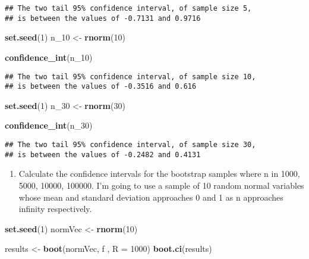 \documentclass[]{article}
\newenvironment{Shaded}{\begin{snugshade}}{\end{snugshade}}
\newcommand{\KeywordTok}[1]{\textcolor[rgb]{0.13,0.29,0.53}{\textbf{#1}}}
\newcommand{\DataTypeTok}[1]{\textcolor[rgb]{0.13,0.29,0.53}{#1}}
\newcommand{\DecValTok}[1]{\textcolor[rgb]{0.00,0.00,0.81}{#1}}
\newcommand{\StringTok}[1]{\textcolor[rgb]{0.31,0.60,0.02}{#1}}
\newcommand{\NormalTok}[1]{#1}
\providecommand{\tightlist}{%
  \setlength{\itemsep}{0pt}\setlength{\parskip}{0pt}}
\begin{document}
\begin{verbatim}
## The two tail 95% confidence interval, of sample size 5, 
## is between the values of -0.7131 and 0.9716
\end{verbatim}

\begin{Shaded}
\begin{Highlighting}[]
\KeywordTok{set.seed}\NormalTok{(}\DecValTok{1}\NormalTok{)}
\NormalTok{n_}\DecValTok{10}\NormalTok{ <-}\StringTok{ }\KeywordTok{rnorm}\NormalTok{(}\DecValTok{10}\NormalTok{)}

\KeywordTok{confidence_int}\NormalTok{(n_}\DecValTok{10}\NormalTok{)}
\end{Highlighting}
\end{Shaded}

\begin{verbatim}
## The two tail 95% confidence interval, of sample size 10, 
## is between the values of -0.3516 and 0.616
\end{verbatim}

\begin{Shaded}
\begin{Highlighting}[]
\KeywordTok{set.seed}\NormalTok{(}\DecValTok{1}\NormalTok{)}
\NormalTok{n_}\DecValTok{30}\NormalTok{ <-}\StringTok{ }\KeywordTok{rnorm}\NormalTok{(}\DecValTok{30}\NormalTok{)}

\KeywordTok{confidence_int}\NormalTok{(n_}\DecValTok{30}\NormalTok{)}
\end{Highlighting}
\end{Shaded}

\begin{verbatim}
## The two tail 95% confidence interval, of sample size 30, 
## is between the values of -0.2482 and 0.4131
\end{verbatim}

\begin{enumerate}
\def\labelenumi{\arabic{enumi})}
\setcounter{enumi}{1}
\tightlist
\item
  Calculate the confidence intervals for the bootstrap samples where n
  in 1000, 5000, 10000, 100000. I'm going to use a sample of 10 random
  normal variables whose mean and standard deviation approaches 0 and 1
  as n approaches infinity respectively.
\end{enumerate}

\begin{Shaded}
\begin{Highlighting}[]
\KeywordTok{set.seed}\NormalTok{(}\DecValTok{1}\NormalTok{)}
\NormalTok{normVec <-}\StringTok{ }\KeywordTok{rnorm}\NormalTok{(}\DecValTok{10}\NormalTok{)}

\NormalTok{results <-}\StringTok{ }\KeywordTok{boot}\NormalTok{(normVec, f , }\DataTypeTok{R =} \DecValTok{1000}\NormalTok{)}
\KeywordTok{boot.ci}\NormalTok{(results)}
\end{Highlighting}
\end{Shaded}
\end{document}
